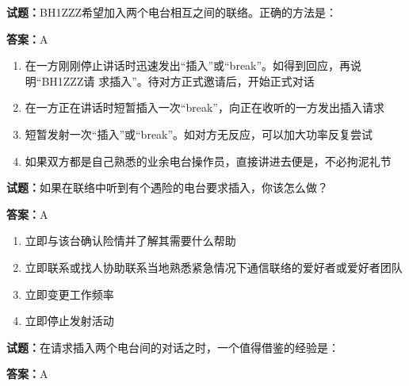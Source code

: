 \documentclass{ctexbook}
\begin{document}
\vspace{1em}

\textbf{试题：}BH1ZZZ希望加入两个电台相互之间的联络。正确的方法是： 

\textbf{答案：}A 

\begin{enumerate}[leftmargin=3em]
  \item 在一方刚刚停止讲话时迅速发出“插入”或“break”。如得到回应，再说明“BH1ZZZ请
求插入”。待对方正式邀请后，开始正式对话 

  \item 在一方正在讲话时短暂插入一次“break”，向正在收听的一方发出插入请求 

  \item 短暂发射一次“插入”或“break”。如对方无反应，可以加大功率反复尝试 

  \item 如果双方都是自己熟悉的业余电台操作员，直接讲进去便是，不必拘泥礼节 


\end{enumerate}





\vspace{1em}

\textbf{试题：}如果在联络中听到有个遇险的电台要求插入，你该怎么做？ 

\textbf{答案：}A 

\begin{enumerate}[leftmargin=3em]
  \item 立即与该台确认险情并了解其需要什么帮助 

  \item 立即联系或找人协助联系当地熟悉紧急情况下通信联络的爱好者或爱好者团队 

  \item 立即变更工作频率 

  \item 立即停止发射活动 

\end{enumerate}





\vspace{1em}

\textbf{试题：}在请求插入两个电台间的对话之时，一个值得借鉴的经验是： 

\textbf{答案：}A 
\end{document}
